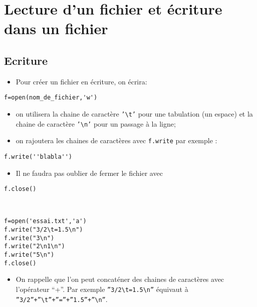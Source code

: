 \def\t{\textbackslash t}
\def\n{\textbackslash n}

\section*{Lecture d'un fichier et écriture dans un fichier}
	
\subsection*{Ecriture}

\begin{itemize}
\item Pour créer un fichier en écriture, on écrira:
\end{itemize}

\begin{lstlisting}
f=open(nom_de_fichier,'w')
\end{lstlisting}

\begin{itemize}
\item on utilisera la chaine de caractère \texttt{'\t'} pour une tabulation (un espace) et la chaine de caractère \texttt{'\n'} pour un passage à la ligne;
\item on rajoutera les chaines de caractères avec \texttt{f.write} par exemple :
\end{itemize}

\begin{lstlisting}
f.write(''blabla'')
\end{lstlisting}

\begin{itemize}
\item Il ne faudra pas oublier de fermer le fichier avec 
\end{itemize}

\begin{lstlisting}
f.close()
\end{lstlisting}


\begin{exemple}~\\
\begin{lstlisting}
f=open('essai.txt','a')
f.write("3/2\t=1.5\n")
f.write("3\n")
f.write("2\n1\n")
f.write("5\n")
f.close()
\end{lstlisting}
\end{exemple}

\begin{itemize}
\item On rappelle que l'on peut concaténer des chaines de caractères avec l'opérateur “+”. Par exemple \texttt{''3/2\t=1.5\n''} équivaut à \texttt{''3/2''+''\t''+''=''+''1.5''+''\n''}.
\end{itemize}

